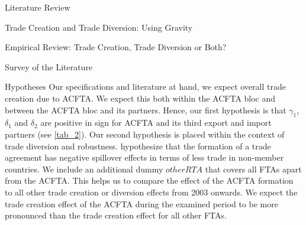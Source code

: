 \begin{section}{Literature Review}
\begin{subsection}{Trade Creation and Trade Diversion: Using Gravity}
\begin{subsection}{Empirical Review: Trade Creation, Trade Diversion or Both?}
\begin{subsubsection}{Survey of the Literature}
\end{subsubsection}


\begin{subsubsection}{Hypotheses}
Our specifications and literature at hand, we expect overall trade creation due to ACFTA. We expect this both within the ACFTA bloc and between the ACFTA bloc and its partners. Hence, our first hypothesis is that $\gamma_1$, $\delta_1$ and $\delta_2$ are positive in sign for ACFTA and its third export and import partners (see \autoref{tab_2}).
\pagebreak
Our second hypothesis is placed within the context of trade diversion and robustness. \cite{ksy2018} hypothesize that the formation of a trade agreement has negative spillover effects in terms of less trade in non-member countries. We include an additional dummy $otherRTA$ that covers all FTAs apart from the ACFTA. This helps us to compare the effect of the ACFTA formation to all other trade creation or diversion effects from 2003 onwards. We expect the trade creation effect of the ACFTA during the examined period to be more pronounced than the trade creation effect for all other FTAs.
\end{subsubsection}

\end{subsection}

\end{subsection}

\end{section}
